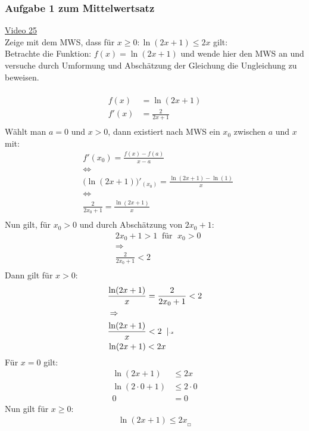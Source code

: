 \subsubsection{Aufgabe 1 zum Mittelwertsatz}
\href{https://youtu.be/EaH9h63wHm0}{Video 25}\\
Zeige mit dem MWS, dass für $ x\geq 0: \ln(2x+1)\leq 2x $ gilt:\\
Betrachte die Funktion: $ f(x)=\ln(2x+1) $ und wende hier den MWS an und versuche durch Umformung und Abschätzung der Gleichung die Ungleichung zu beweisen.\\\\
\begin{align*}
f(x)&=\ln(2x+1)\\
f'(x)&=\frac{2}{2x+1}\\
\end{align*}
Wählt man $ a=0 $ und $ x>0 $, dann existiert nach MWS ein $ x_0 $ zwischen $ a $ und $ x $ mit:\\
\begin{align*}
&f'(x_0)=\frac{f(x)-f(a)}{x-a}\\
&\Leftrightarrow\\
&\big(\ln(2x+1)\big)'_{(x_0)}=\frac{\ln(2x+1)-\ln(1)}{x}\\
&\Leftrightarrow\\
&\frac{2}{2x_0+1}=\frac{\ln(2x+1)}{x}\\
\end{align*}
Nun gilt, für $ x_0>0 $ und durch Abschätzung von $ 2x_0+1 $:\\
\begin{align*}
&2x_0+1>1\;\;\text{für }\;x_0>0\\
&\Rightarrow\\
&\frac{2}{2x_0+1}<2\\
\end{align*}
Dann gilt für $ x>0 $:\\
\begin{align*}
&\frac{\ln(2x+1)}{x}=\frac{2}{2x_0+1}<2\\
&\Rightarrow\\
&\frac{\ln(2x+1)}{x}<2\;\;|\text{\tiny $\cdot x$ }\\
&\ln(2x+1)<2x
\end{align*}
Für $ x=0 $ gilt:\\
\begin{align*}
\ln(2x+1)&\leq 2x\\
\ln(2\cdot0+1)&\leq 2\cdot 0\\
0&=0
\end{align*}
Nun gilt für $ x\geq0 $:\\
\begin{align*}
\ln(2x+1)\leq 2x_{_{\Square}}\\
\end{align*}
